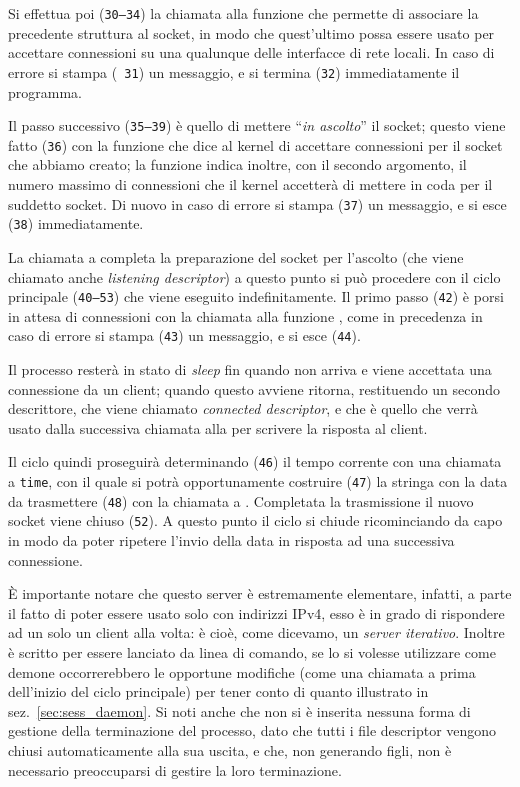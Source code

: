 Si effettua poi (\texttt{\small 30--34}) la chiamata alla funzione 
che permette di associare la precedente struttura al socket, in modo che
quest'ultimo possa essere usato per accettare connessioni su una qualunque
delle interfacce di rete locali. In caso di errore si stampa (\texttt{\small
  31}) un messaggio, e si termina (\texttt{\small 32}) immediatamente il
programma.

Il passo successivo (\texttt{\small 35--39}) è quello di mettere ``\textsl{in
  ascolto}'' il socket; questo viene fatto (\texttt{\small 36}) con la
funzione  che dice al kernel di accettare connessioni per il
socket che abbiamo creato; la funzione indica inoltre, con il secondo
argomento, il numero massimo di connessioni che il kernel accetterà di mettere
in coda per il suddetto socket. Di nuovo in caso di errore si stampa
(\texttt{\small 37}) un messaggio, e si esce (\texttt{\small 38})
immediatamente.

La chiamata a  completa la preparazione del socket per l'ascolto
(che viene chiamato anche \textit{listening descriptor}) a questo punto si può
procedere con il ciclo principale (\texttt{\small 40--53}) che viene eseguito
indefinitamente. Il primo passo (\texttt{\small 42}) è porsi in attesa di
connessioni con la chiamata alla funzione , come in precedenza in
caso di errore si stampa (\texttt{\small 43}) un messaggio, e si esce
(\texttt{\small 44}).

Il processo resterà in stato di \textit{sleep} fin quando non arriva e viene
accettata una connessione da un client; quando questo avviene 
ritorna, restituendo un secondo descrittore, che viene chiamato
\textit{connected descriptor}, e che è quello che verrà usato dalla successiva
chiamata alla  per scrivere la risposta al client.

Il ciclo quindi proseguirà determinando (\texttt{\small 46}) il tempo corrente
con una chiamata a \texttt{time}, con il quale si potrà opportunamente
costruire (\texttt{\small 47}) la stringa con la data da trasmettere
(\texttt{\small 48}) con la chiamata a . Completata la
trasmissione il nuovo socket viene chiuso (\texttt{\small 52}).  A questo
punto il ciclo si chiude ricominciando da capo in modo da poter ripetere
l'invio della data in risposta ad una successiva connessione.

È importante notare che questo server è estremamente elementare, infatti, a
parte il fatto di poter essere usato solo con indirizzi IPv4, esso è in grado
di rispondere ad un solo un client alla volta: è cioè, come dicevamo, un
\textsl{server iterativo}. Inoltre è scritto per essere lanciato da linea di
comando, se lo si volesse utilizzare come demone occorrerebbero le opportune
modifiche (come una chiamata a  prima dell'inizio del ciclo
principale) per tener conto di quanto illustrato in
sez.~\ref{sec:sess_daemon}. Si noti anche che non si è inserita nessuna forma
di gestione della terminazione del processo, dato che tutti i file descriptor
vengono chiusi automaticamente alla sua uscita, e che, non generando figli,
non è necessario preoccuparsi di gestire la loro terminazione.


